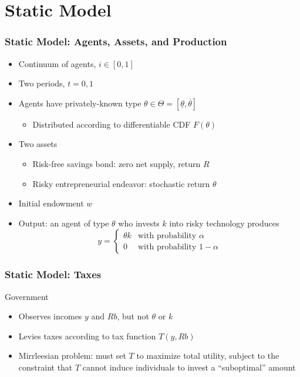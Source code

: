 \documentclass{beamer}
\begin{document}
\section{Static Model}
\begin{frame}
    \frametitle{Static Model: Agents, Assets, and Production}

    \begin{itemize}
        \item Continuum of agents, \( i\in[0,1] \)
        \item Two periods, \( t = 0,1 \)
        \item Agents have privately-known type \( \theta\in\Theta=\left[\underline{\theta},\overline{\theta}\right] \)
        \begin{itemize}
            \item Distributed according to differentiable CDF \( F\left( \theta \right) \)
        \end{itemize}
        \item Two assets 
        \begin{itemize}
            \item Risk-free savings bond: zero net supply, return \( R \)
            \item Risky entrepreneurial endeavor: stochastic return \( \theta \)
        \end{itemize} 
        \item Initial endowment \( w \)
        \item Output: an agent of type \( \theta \) who invests \( k \) into risky technology produces 
        \begin{equation}
            y = \begin{cases}
                \theta k & \text{with probability }\alpha \\
                0 & \text{with probability }1 - \alpha
            \end{cases}
        \end{equation}
    \end{itemize}

\end{frame}

\begin{frame}
    \frametitle{Static Model: Taxes}
    
    Government
    \begin{itemize}
        \item Observes incomes \( y \) and \( Rb \), but not \( \theta \) or \( k \)
        \item Levies taxes according to tax function \( T\left( y,Rb \right) \)
        \item Mirrleesian problem: must set \( T \) to maximize total utility, subject to the constraint that \( T \) cannot induce individuals to invest a ``suboptimal'' amount
    \end{itemize}

\end{frame}
\end{document}
